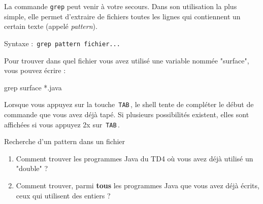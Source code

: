 \documentclass[a4paper,11pt]{article}
\begin{document}
            	\par
        
			
		La commande \verb_grep_ peut venir \`a votre secours. Dans son utilisation la plus simple, elle permet d'extraire de fichiers toutes les lignes qui contiennent un certain texte (appel\'e 
		\textit{pattern}).
					
		\par
		Syntaxe : \,\verb|grep pattern fichier...|\,
                 \par
        
			
				
           	\begin{Exemple}{}
			Pour trouver dans quel fichier vous avez utilis\'e une variable nomm\'ee "surface", vous pouvez \'ecrire :
				\begin{Console}
					grep surface *.java
				\end{Console}
		\end{Exemple}
            \par
        

        
          	Lorsque vous appuyez sur la touche \,\verb|TAB|\,, le shell tente de compl\'eter le d\'ebut de commande que vous avez d\'ej\`a tap\'e. 
		Si plusieurs possibilit\'es existent, elles sont affich\'ees si vous appuyez 2x sur  \,\verb|TAB|\,.  
        
            	\par
        
			
		\begin{Exercice}{Recherche d'un pattern dans un fichier} 
			\begin{enumerate}
				\item Comment trouver les programmes Java du TD4 o\`u vous avez d\'ej\`a utilis\'e un "double" ?
		 
		 		\item Comment trouver, parmi \textbf{tous} les programmes Java que vous avez d\'ej\`a \'ecrits, ceux qui utilisent des entiers ?
			\end{enumerate}
			\par\medskip
            \par

		\end{Exercice}		
\end{document}
